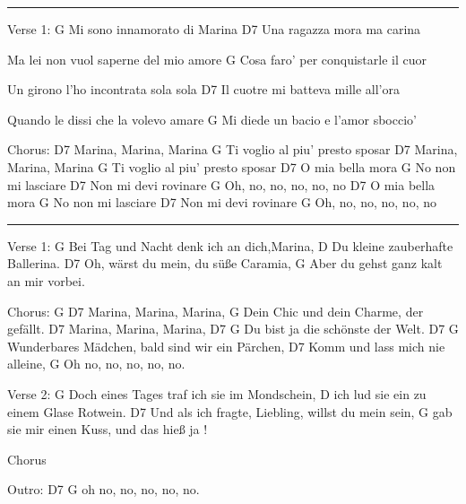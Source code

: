 \noindent\rule{\columnwidth}{1pt}

\begin{lstsong}
Verse 1:
G 
Mi sono innamorato di Marina
                      D7
Una ragazza mora ma carina

Ma lei non vuol saperne del mio amore
                               G
Cosa faro' per conquistarle il cuor

Un girono l'ho incontrata sola sola
                               D7
Il cuotre mi batteva mille all'ora

Quando le dissi che la volevo amare
                                G
Mi diede un bacio e l'amor sboccio'

Chorus:
                  D7
Marina, Marina, Marina
                            G
Ti voglio al piu' presto sposar
                  D7
Marina, Marina, Marina
                            G
Ti voglio al piu' presto sposar
            D7
O mia bella mora
             G
No non mi lasciare
                D7
Non mi devi rovinare
                    G
Oh, no, no, no, no, no
            D7
O mia bella mora
             G
No non mi lasciare
                D7
Non mi devi rovinare
                    G
Oh, no, no, no, no, no
\end{lstsong}
\newpage

\noindent\rule{\columnwidth}{1pt}

\begin{lstsong}
Verse 1:
    G
Bei Tag und Nacht denk ich an dich,Marina,
                            D
Du kleine zauberhafte Ballerina.
    D7                       
Oh, wärst du mein, du süße Caramia,
                                  G
Aber du gehst ganz kalt an mir vorbei.

Chorus:
  G                 D7
Marina, Marina, Marina,
                                 G
Dein Chic und dein Charme, der gefällt.
                    D7
Marina, Marina, Marina,
   D7                       G
Du bist ja die schönste der Welt.
            D7                         G
Wunderbares Mädchen, bald sind wir ein Pärchen,
                         D7     
Komm und lass mich nie alleine, 
                   G
Oh no, no, no, no, no.

Verse 2:
     G
Doch eines Tages traf ich sie im Mondschein,
                                  D
ich lud sie ein zu einem Glase Rotwein.
    D7
Und als ich fragte, Liebling, willst du mein sein,
                                     G
gab sie mir einen Kuss, und das hieß ja !

Chorus

Outro:
   D7              G
oh no, no, no, no, no.
\end{lstsong}
\newpage


